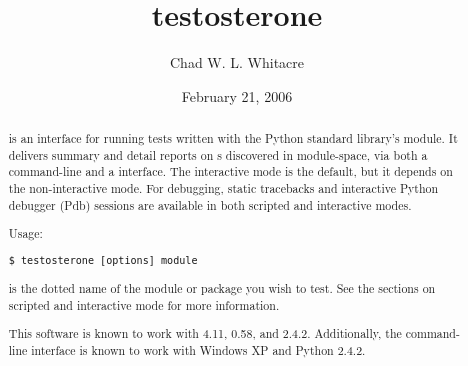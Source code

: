 \documentclass{manual}
\title{testosterone}
\author{Chad W. L. Whitacre}
\date{February 21, 2006}		%
\begin{document}
\maketitle

\begin{abstract}

\noindent

 is an interface for running tests written with the Python
standard library's  module. It delivers summary and detail
reports on s discovered in module-space, via both a command-line
and a  interface. The interactive mode is the default, but it
depends on the non-interactive mode. For debugging, static tracebacks and
interactive Python debugger (Pdb) sessions are available in both scripted and
interactive modes.

Usage:

\begin{verbatim}
$ testosterone [options] module
\end{verbatim}

 is the dotted name of the module or package you wish to test. See
the sections on scripted and interactive mode for more information.

This software is known to work with 
4.11,  0.58,
and  2.4.2. Additionally, the command-line
interface is known to work with Windows XP and Python 2.4.2.


\end{abstract}




\end{document}
